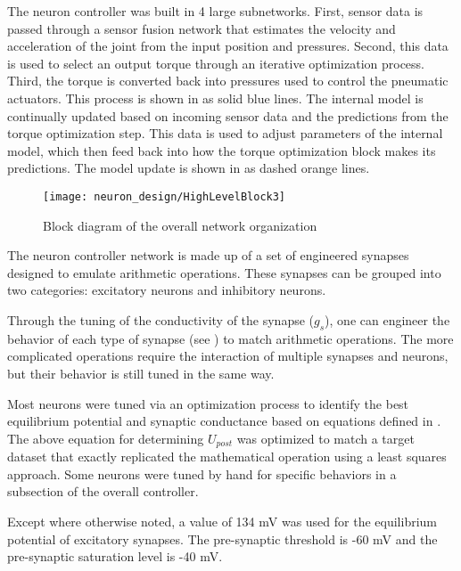The neuron controller was built in 4 large subnetworks. First, sensor data is passed through a sensor fusion network that estimates the velocity and acceleration of the joint from the input position and pressures. Second, this data is used to select an output torque through an iterative optimization process. Third, the torque is converted back into pressures used to control the pneumatic actuators. This process is shown in  as solid blue lines. The internal model is continually updated based on incoming sensor data and the predictions from the torque optimization step. This data is used to adjust parameters of the internal model, which then feed back into how the torque optimization block makes its predictions. The model update is shown in  as dashed orange lines.

\begin{figure}
\centering
\texttt{[image: neuron\_design/HighLevelBlock3]}
\caption{Block diagram of the overall network organization}
\label{fig:HighLevelBlock}
\end{figure}

\label{sec:key_synapses}

The neuron controller network is made up of a set of engineered synapses
designed to emulate arithmetic operations. These synapses can be grouped into two
categories: excitatory neurons and inhibitory neurons.

Through the tuning of the conductivity of the synapse ($g_{s}$), one can engineer the behavior of each type of synapse (see ) to match arithmetic operations. The more complicated operations require the interaction of multiple synapses and neurons, but their behavior is still tuned in the same way.

Most neurons were tuned
via an optimization process to identify the best equilibrium potential and
synaptic conductance based on equations defined in 
\cite{NickFunctionalSubnetwork}. The above equation for determining $U_{post}$ was optimized to match a target dataset that exactly replicated the mathematical operation using a least squares approach.
Some neurons were tuned by hand for specific behaviors in
a subsection of the overall controller.


Except where otherwise noted, a value of 134 mV was used for the equilibrium
potential of excitatory synapses. The pre-synaptic threshold is -60 mV and the pre-synaptic saturation
level is -40 mV.

